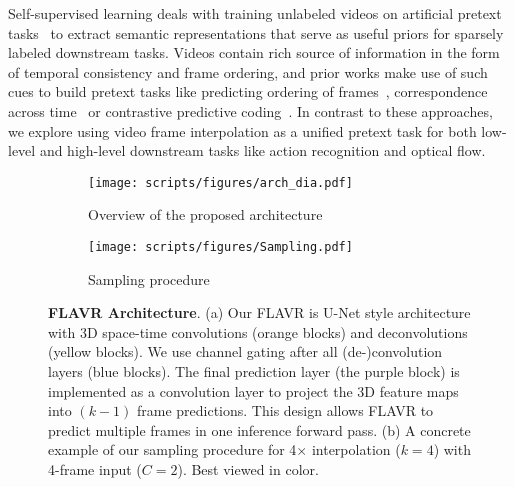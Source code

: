 \documentclass[10pt,twocolumn,letterpaper]{article}
\begin{document}
Self-supervised learning deals with training unlabeled videos on artificial pretext tasks~\cite{doersch2015unsupervised} to extract semantic representations that serve as useful priors for sparsely labeled downstream tasks. Videos contain rich source of information in the form of temporal consistency and frame ordering, and prior works make use of such cues to build pretext tasks like predicting ordering of frames~\cite{xu2019self, lee2017unsupervised, fernando2017self, misra2016shuffle, wei2018learning}, 
correspondence across time~\cite{jayaraman2016slow, wang2015unsupervised} or contrastive predictive coding~\cite{han2019video, han2020memory}. In contrast to these approaches, we explore using video frame interpolation as a unified pretext task for both low-level and high-level downstream tasks like action recognition and optical flow.




\begin{figure*}
     \begin{center}
     \begin{subfigure}[b]{0.49\textwidth}
        \centering
        \texttt{[image: scripts/figures/arch\_dia.pdf]}
        \captionsetup{width=\textwidth}
        \caption{Overview of the proposed architecture}
        \label{fig:arch}
     \end{subfigure}
     \hfill
     \begin{subfigure}[b]{0.49\textwidth}
        \centering
        \texttt{[image: scripts/figures/Sampling.pdf]}
        \caption{Sampling procedure}
        \label{fig:sampling}
     \end{subfigure}
     \end{center}
\vspace{-12pt}
\caption{{\bf FLAVR Architecture}. (a) Our FLAVR is U-Net style architecture with 3D space-time convolutions (orange blocks) and deconvolutions (yellow blocks). We use channel gating after all (de-)convolution layers (blue blocks). The final prediction layer (the purple block) is implemented as a convolution layer to project the 3D feature maps into $(k{-}1)$ frame predictions. This design allows FLAVR to predict multiple frames in one inference forward pass. (b) A concrete example of our sampling procedure for 4$\times$ interpolation ($k{=}4$) with 4-frame input ($C{=}2$). Best viewed in color.} 
\vspace{-8pt}
\label{fig:architecture}
\end{figure*}
\end{document}
